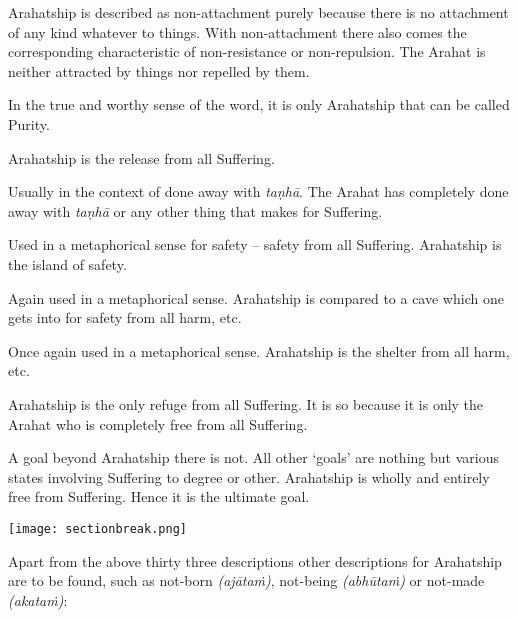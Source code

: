 
Arahatship is described as non-attachment purely because there is no attachment of any kind whatever to things. With non-attachment there also comes the corresponding characteristic of non-resistance or non-repulsion. The Arahat is neither attracted by things nor repelled by them.


\protect\hypertarget{suddhi}{}{}In the true and worthy sense of the word, it is only Arahatship that can be called Purity.


Arahatship is the release from all Suffering.


Usually in the context of done away with \emph{taṇhā}. The Arahat has completely done away with \emph{taṇhā} or any other thing that makes for Suffering.


Used in a metaphorical sense for safety -- safety from all Suffering. Arahatship is the island of safety.


Again used in a metaphorical sense. Arahatship is compared to a cave which one gets into for safety from all harm, etc.


Once again used in a metaphorical sense. Arahatship is the shelter from all harm, etc.


Arahatship is the only refuge from all Suffering. It is so because it is only the Arahat who is completely free from all Suffering.


A goal beyond Arahatship there is not. All other `goals' are nothing but various states involving Suffering to  degree or other. Arahatship is wholly and entirely free from Suffering. Hence it is the ultimate goal.

\texttt{[image: sectionbreak.png]}

Apart from the above thirty three descriptions other descriptions for Arahatship are to be found, such as not-born \emph{(ajātaṁ)}, not-being \emph{(abhūtaṁ)} or not-made \emph{(akataṁ)}:

